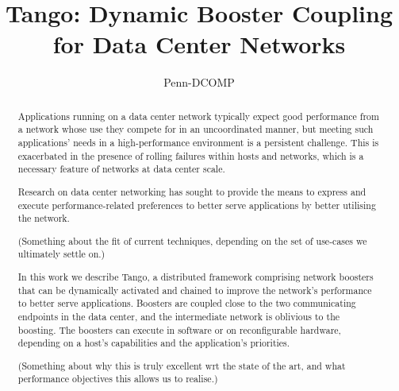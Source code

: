 \documentclass[sigconf]{acmart}
\begin{document}
\title{Tango: Dynamic Booster Coupling for Data Center Networks}

\author{Penn-DCOMP}
%
%
%
%


\renewcommand{\shortauthors}{F. Lastname et al.}


\begin{abstract}
Applications running on a data center network typically expect good performance
from a network whose use they compete for in an uncoordinated manner, but
meeting such applications' needs in a high-performance environment is a
persistent challenge. This is exacerbated in the presence of rolling failures
within hosts and networks, which is a necessary feature of networks at data
center scale.

Research on data center networking has sought to provide the means to
express and execute performance-related preferences to better serve
applications by better utilising the network.

(Something about the fit of current techniques, depending on the set of use-cases we ultimately settle on.)

In this work we describe Tango, a distributed framework comprising network
boosters that can be dynamically activated and chained to improve the network's
performance to better serve applications. Boosters are coupled close to the two
communicating endpoints in the data center, and the intermediate network is
oblivious to the boosting. The boosters can execute in software or on
reconfigurable hardware, depending on a host's capabilities and the
application's priorities.

(Something about why this is truly excellent wrt the state of the art, and what performance objectives this allows us to realise.)
\end{abstract}
\end{document}
